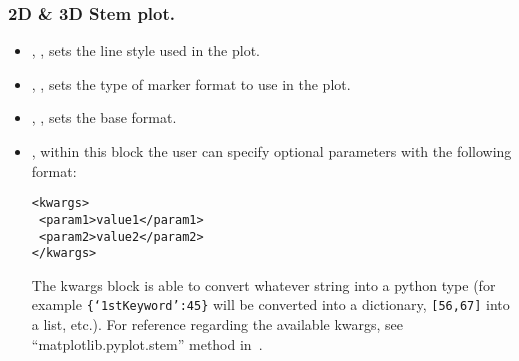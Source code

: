 \subsubsection{2D \& 3D Stem plot.}
  \begin{itemize}
  \item {}, , sets the line
  style used in the plot.
  \item {}, , sets the type of
  marker format to use in the plot.
  \item {}, , sets the base
  format.
  \item {}, within this block the user can specify optional
  parameters with the following format:

\begin{lstlisting}[style=XML]
<kwargs>
 <param1>value1</param1>
 <param2>value2</param2>
</kwargs>
\end{lstlisting}

    The kwargs block is able to convert whatever string into a python type (for
    example \texttt{\{`1stKeyword':45\}} will
    be converted into a dictionary, 
    \texttt{[56,67]} into a list, etc.).
  For reference regarding the available kwargs, see ``matplotlib.pyplot.stem''
  method in~\cite{MatPlotLib}.
    \end{itemize}

